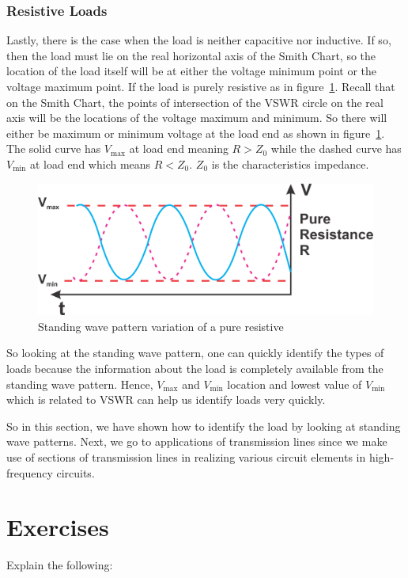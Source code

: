 \subsubsection{Resistive Loads}
Lastly, there is the case when the load is neither capacitive nor inductive. If so, then the load must lie on the real horizontal axis of the Smith Chart, so the location of the load itself will be at either the voltage minimum point or the voltage maximum point. If the load is purely resistive as in figure~\ref{fig:group95}. Recall that on the Smith Chart, the points of intersection of the VSWR circle on the real axis will be the locations of the voltage maximum and minimum. So there will either be maximum or minimum voltage at the load end as shown in figure~\ref{fig:group95}. The solid curve has ${V_\max}$ at load end meaning ${R>Z_0}$ while the dashed curve has ${V_\min}$ at load end which means ${R<Z_0}$. ${Z_0}$ is the characteristics impedance.
\begin{figure}[h]
\centering
\includegraphics[scale=0.5]{./graphics/Group95}
\caption{Standing wave pattern variation of a pure resistive}
\label{fig:group95}
\end{figure}

So looking at the standing wave pattern, one can quickly identify the types of loads because the information about the load is completely available from the standing wave pattern. Hence, ${V_\max}$ and ${V_\min}$ location and lowest value of ${V_\min}$ which is related to VSWR can help us identify loads very quickly.

So in this section, we have shown how to identify the load by looking at standing wave patterns. Next, we go to applications of transmission lines since we make use of sections of transmission lines in realizing various circuit elements in high-frequency circuits.

\section*{Exercises}
\begin{ExerciseList}
\Exercise[label={ex91}]
Explain the following:
\end{ExerciseList}